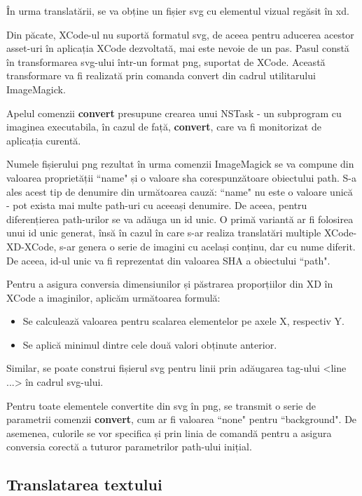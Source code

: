 În urma translatării, se va obține un fișier svg cu elementul vizual regăsit în xd. 

Din păcate, XCode-ul nu suportă formatul svg, de aceea pentru aducerea acestor asset-uri în aplicația XCode dezvoltată, mai este nevoie de un pas. Pasul constă în transformarea svg-ului într-un format png, suportat de XCode. Această transformare va fi realizată prin comanda convert din cadrul utilitarului ImageMagick. 

Apelul comenzii \textbf{convert} presupune crearea unui NSTask - un subprogram cu imaginea executabila, în cazul de față, \textbf{convert}, care va fi monitorizat de aplicația curentă. 

Numele fișierului png rezultat în urma comenzii ImageMagick se va compune din valoarea proprietății ``name" și o valoare sha corespunzătoare obiectului path. S-a ales acest tip de denumire din următoarea cauză: ``name" nu este o valoare unică - pot exista mai multe path-uri cu aceeași denumire. De aceea, pentru diferențierea path-urilor se va adăuga un id unic. O primă variantă ar fi folosirea unui id unic generat, însă în cazul în care s-ar realiza translatări multiple XCode-XD-XCode, s-ar genera o serie de imagini cu același conținu, dar cu nume diferit. De aceea, id-ul unic va fi reprezentat din valoarea SHA a obiectului ``path".

Pentru a asigura conversia dimensiunilor și păstrarea proporțiilor din XD în XCode a imaginilor, aplicăm următoarea formulă:

\begin{itemize}  
\item Se calculează valoarea pentru scalarea elementelor pe axele X, respectiv Y.
\item Se aplică minimul dintre cele două valori obținute anterior.
\end{itemize}

Similar, se poate construi fișierul svg pentru linii prin adăugarea tag-ului <line ...> în cadrul svg-ului.

Pentru toate elementele convertite din svg în png, se transmit o serie de parametrii comenzii \textbf{convert}, cum ar fi valoarea ``none" pentru ``background". De asemenea, culorile se vor specifica și prin linia de comandă pentru a asigura conversia corectă a tuturor parametrilor path-ului inițial.

\subsection{Translatarea textului}


